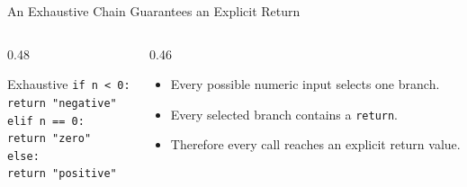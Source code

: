 \documentclass[aspectratio=169,10pt]{beamer}
\begin{document}
\begin{frame}{An Exhaustive Chain Guarantees an Explicit Return}
  \begin{columns}[T,onlytextwidth]
    \begin{column}{0.48\textwidth}
      \begin{block}{Exhaustive}
        \texttt{if n < 0:}\\
        \hspace*{0.20in}\texttt{return "negative"}\\
        \texttt{elif n == 0:}\\
        \hspace*{0.20in}\texttt{return "zero"}\\
        \texttt{else:}\\
        \hspace*{0.20in}\texttt{return "positive"}
      \end{block}
    \end{column}

    \begin{column}{0.46\textwidth}
      \begin{itemize}
        \item Every possible numeric input selects one branch.
        \item Every selected branch contains a \texttt{return}.
        \item Therefore every call reaches an explicit return value.
      \end{itemize}
    \end{column}
  \end{columns}
\end{frame}
\end{document}
